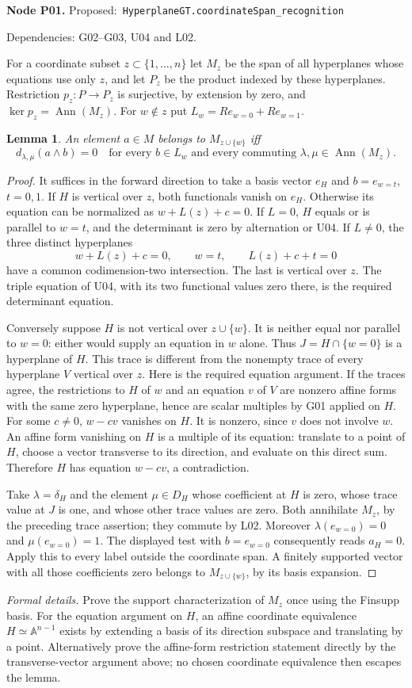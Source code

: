 \documentclass[11pt]{article}
\newtheorem{lemma}[theorem]{Lemma}
\theoremstyle{remark}\newtheorem{remark}[theorem]{Remark}
\newcommand{\A}{\mathbb A}
\newcommand{\Ann}{\operatorname{Ann}}
\newcommand{\code}[1]{\nolinkurl{#1}}
\newcommand{\node}[3]{\par\Needspace{8\baselineskip}\smallskip\noindent\textbf{Node #1.}\quad
 \textsf{Proposed:}\ \code{#2}\par\noindent
 \textsf{Dependencies:} #3.\par\smallskip}
\begin{document}
\node{P01}{HyperplaneGT.coordinateSpan_recognition}{G02--G03, U04 and L02}
For a coordinate subset $z\subset\{1,\ldots,n\}$ let $M_z$ be
the span of all hyperplanes whose equations use only $z$, and let
$P_z$ be the product indexed by these hyperplanes. Restriction
$p_z:P\to P_z$ is surjective, by extension by zero, and
$\ker p_z=\Ann(M_z)$. For $w\notin z$ put
$L_w=Re_{w=0}+Re_{w=1}$.
\begin{lemma}\label{lem:p01}
An element $a\in M$ belongs to $M_{z\cup\{w\}}$ iff
\[
 d_{\lambda,\mu}(a\wedge b)=0
 \quad\text{for every }b\in L_w\text{ and every commuting }
 \lambda,\mu\in\Ann(M_z).
\]
\end{lemma}
\begin{proof}
It suffices in the forward direction to take a basis vector $e_H$
and $b=e_{w=t}$, $t=0,1$. If $H$ is vertical over $z$, both
functionals vanish on $e_H$. Otherwise its equation can be normalized
as $w+L(z)+c=0$. If $L=0$, $H$ equals or is parallel to $w=t$,
and the determinant is zero by alternation or U04. If $L\ne0$,
the three distinct hyperplanes
\[
 w+L(z)+c=0,\qquad w=t,\qquad L(z)+c+t=0
\]
have a common codimension-two intersection. The last is vertical
over $z$. The triple equation of U04, with its two functional
values zero there, is the required determinant equation.

Conversely suppose $H$ is not vertical over $z\cup\{w\}$.
It is neither equal nor parallel to $w=0$: either would supply
an equation in $w$ alone. Thus $J=H\cap\{w=0\}$ is a hyperplane
of $H$. This trace is different from the nonempty trace of every
hyperplane $V$ vertical over $z$. Here is the required equation
argument. If the traces agree, the restrictions to $H$ of $w$ and
an equation $v$ of $V$ are nonzero affine forms with the same zero
hyperplane, hence are scalar multiples by G01 applied on $H$.
For some $c\ne0$, $w-cv$ vanishes on $H$. It is nonzero, since
$v$ does not involve $w$. An affine form vanishing on $H$ is a
multiple of its equation: translate to a point of $H$, choose a
vector transverse to its direction, and evaluate on this direct
sum. Therefore $H$ has equation $w-cv$, a contradiction.

Take $\lambda=\delta_H$ and the element $\mu\in D_H$ whose
coefficient at $H$ is zero, whose trace value at $J$ is one, and
whose other trace values are zero. Both annihilate $M_z$, by the
preceding trace assertion; they commute by L02. Moreover
$\lambda(e_{w=0})=0$ and $\mu(e_{w=0})=1$. The displayed test
with $b=e_{w=0}$ consequently reads $a_H=0$. Apply this to every
label outside the coordinate span. A finitely supported vector
with all those coefficients zero belongs to $M_{z\cup\{w\}}$,
by its basis expansion.
\end{proof}
\emph{Formal details.} Prove the support characterization of $M_z$
once using the Finsupp basis. For the equation argument on $H$, an
affine coordinate equivalence $H\simeq\A^{n-1}$ exists by extending
a basis of its direction subspace and translating by a point.
Alternatively prove the affine-form restriction statement directly
by the transverse-vector argument above; no chosen coordinate
equivalence then escapes the lemma.
\end{document}
